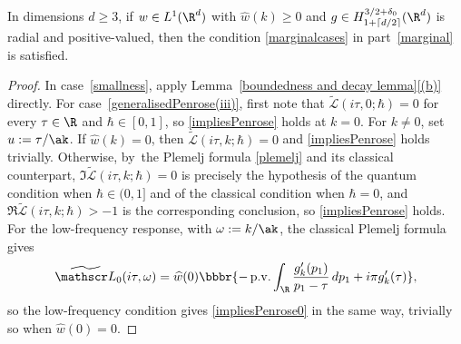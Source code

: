 \begin{remark}
In dimensions \( d \geq 3 \), if \( w \in L^1(\R^d) \) with $\widehat w(k)\geq0$ and \( g \in H^{3/2+\delta_0}_{1+\lceil d/2 \rceil}(\R^d) \) is radial and positive-valued, then the condition \eqref{marginalcases} in part~\eqref{marginal} is satisfied.
\end{remark}
\begin{proof}
In case~\eqref{smallness}, apply Lemma~\ref{boundedness and decay lemma}\eqref{(b)} directly. For case~\eqref{generalisedPenrose(iii)}, first note that $\widetilde{\mathscr L}(i\tau,0;\hbar)=0$ for every $\tau\in\R$ and $\hbar\in[0,1]$, so \eqref{impliesPenrose} holds at $k=0$. For $k\neq0$, set $u:=\tau/\ak$. If $\widehat w(k)=0$, then $\widetilde{\mathscr L}(i\tau,k;\hbar)=0$ and \eqref{impliesPenrose} holds trivially. Otherwise, by~the Plemelj formula \eqref{plemelj} and its classical counterpart, $\Im\widetilde{\mathscr L}(i\tau,k;\hbar)=0$ is precisely the hypothesis of the quantum condition when $\hbar\in(0,1]$ and of the classical condition when $\hbar=0$, and $\Re\widetilde{\mathscr L}(i\tau,k;\hbar)>-1$ is the corresponding conclusion, so \eqref{impliesPenrose} holds. For the low-frequency response, with $\omega:=k/\ak$, the classical Plemelj formula gives
\[
\widetilde{\mathscr L}_0(i\tau,\omega) = \widehat w(0)\bbbr{-\,\mathrm{p.v.}\int_{\R}\frac{g_k'(p_1)}{p_1-\tau}\,dp_1+i\pi g_k'(\tau)},
\]
so the low-frequency condition gives \eqref{impliesPenrose0} in the same way, trivially so when $\widehat w(0)=0$.


\end{proof}
